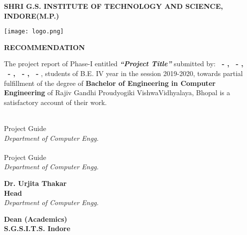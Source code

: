 \pagestyle{plain}
\large
\begin{center}
    


\textbf{SHRI G.S. INSTITUTE OF TECHNOLOGY AND SCIENCE, INDORE(M.P.)\\}

\vspace*{0.7cm}

\texttt{[image: logo.png]}

\vspace*{0.7cm}
\normalfont\LARGE\centering
\textbf{RECOMMENDATION} \\
\end{center}
\normalsize
The project report of Phase-I entitled \emph{\textbf{``Project Title''}} submitted by:
\textbf{
\rollA\ - \nameA,
\rollB\ - \nameB,
\rollC\ - \nameC,
\rollD\ - \nameD,
\rollE\ - \nameE},
students of B.E. IV year in the session 2019-2020, towards partial fulfillment of the degree of \textbf{Bachelor of Engineering in Computer Engineering} of Rajiv Gandhi Proudyogiki VishwaVidhyalaya, Bhopal is a satisfactory account of their work.



\begin{minipage}[t]{0.45\textwidth}
    \flushleft
    \vspace*{2cm}
    \textbf{\guide} \\
    Project Guide \\
    \emph{Department of Computer Engg.} \\
    \vspace*{2cm}
    \textbf{\coguide} \\
    Project Guide \\
    \emph{Department of Computer Engg.} \\
\end{minipage}
    \hfill
\begin{minipage}[t]{0.45\textwidth}
    \flushleft
    \vspace{2cm}
    \textbf{Dr. Urjita Thakar} \\
    \textbf{Head} \\
    \emph{Department of Computer Engg.} \\
    \vspace*{2.6cm}
    
    
    
\end{minipage}
    
    \vspace*{\fill}
    \begin{center}
    \textbf{Dean (Academics) \\
    S.G.S.I.T.S. Indore \\}    
    \end{center}
    


